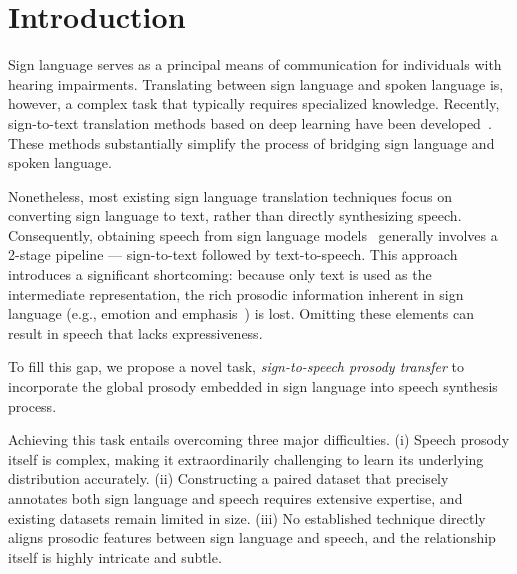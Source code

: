 \section{Introduction}
\label{sec:introduction}
Sign language serves as a principal means of communication for individuals with hearing impairments.
Translating between sign language and spoken language is, 
however, a complex task that typically requires specialized knowledge.
Recently, sign-to-text translation methods based on deep learning have been developed~\cite{Camgoz_2020_CVPR,zhang2023sltunet,lin-etal-2023-gloss,Gong_2024_CVPR,NEURIPS2024_ced76a66}.
These methods substantially simplify the process of bridging sign language and spoken language.

Nonetheless, most existing sign language translation techniques focus on 
converting sign language to text, rather than directly synthesizing speech.
Consequently, obtaining speech from sign language models~\cite{Zhou2020Sign-to-speech,Sharma2020Sign,Dangat2023Sign,Ojha2020Sign,R2022Indian} generally involves a 2-stage pipeline --- sign-to-text followed by text-to-speech.
This approach introduces a significant shortcoming: because only text is used as the intermediate representation, the rich prosodic information inherent in sign language (e.g., emotion and emphasis~\cite{Brentari2015The}) is lost.
Omitting these elements can result in speech that lacks expressiveness.

To fill this gap, we propose a novel task,
\emph{sign-to-speech  prosody transfer}
to incorporate the global prosody embedded in sign language into speech synthesis process.

Achieving this task entails overcoming three major difficulties.
(i) Speech prosody itself is complex, making it extraordinarily challenging to learn its underlying distribution accurately.
(ii) Constructing a paired dataset that precisely annotates both sign language and speech requires extensive expertise, and existing datasets remain limited in size.
(iii) No established technique directly aligns prosodic features between sign language and speech, and the relationship itself is highly intricate and subtle.


